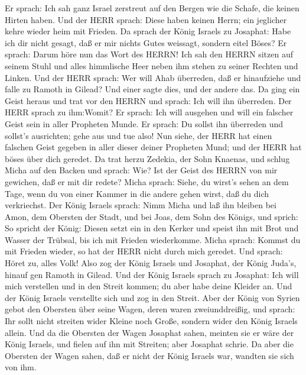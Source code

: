  Er sprach: Ich sah ganz Israel zerstreut auf den Bergen
wie die Schafe, die keinen Hirten haben. Und der HERR sprach: Diese
haben keinen Herrn; ein jeglicher kehre wieder heim mit Frieden.
 Da sprach der König Israels zu Josaphat: Habe ich dir
nicht gesagt, daß er mir nichts Gutes weissagt, sondern eitel Böses?
 Er sprach: Darum höre nun das Wort des HERRN! Ich sah den
HERRN sitzen auf seinem Stuhl und alles himmlische Heer neben ihm stehen
zu seiner Rechten und Linken.  Und der HERR sprach: Wer
will Ahab überreden, daß er hinaufziehe und falle zu Ramoth in Gilead?
Und einer sagte dies, und der andere das.  Da ging ein
Geist heraus und trat vor den HERRN und sprach: Ich will ihn überreden.
Der HERR sprach zu ihm:Womit?  Er sprach: Ich will ausgehen
und will ein falscher Geist sein in aller Propheten Munde. Er sprach: Du
sollst ihn überreden und sollst's ausrichten; gehe aus und tue also!
 Nun siehe, der HERR hat einen falschen Geist gegeben in
aller dieser deiner Propheten Mund; und der HERR hat böses über dich
geredet.  Da trat herzu Zedekia, der Sohn Knaenas, und
schlug Micha auf den Backen und sprach: Wie? Ist der Geist des HERRN von
mir gewichen, daß er mit dir redete?  Micha sprach: Siehe,
du wirst's sehen an dem Tage, wenn du von einer Kammer in die andere
gehen wirst, daß du dich verkriechst.  Der König Israels
sprach: Nimm Micha und laß ihn bleiben bei Amon, dem Obersten der Stadt,
und bei Joas, dem Sohn des Königs,  und sprich: So spricht
der König: Diesen setzt ein in den Kerker und speist ihn mit Brot und
Wasser der Trübsal, bis ich mit Frieden wiederkomme.  Micha
sprach: Kommst du mit Frieden wieder, so hat der HERR nicht durch mich
geredet. Und sprach: Höret zu, alles Volk!  Also zog der
König Israels und Josaphat, der König Juda's, hinauf gen Ramoth in
Gilead.  Und der König Israels sprach zu Josaphat: Ich will
mich verstellen und in den Streit kommen; du aber habe deine Kleider an.
Und der König Israels verstellte sich und zog in den Streit.
 Aber der König von Syrien gebot den Obersten über seine
Wagen, deren waren zweiunddreißig, und sprach: Ihr sollt nicht streiten
wider Kleine noch Große, sondern wider den König Israels allein.
 Und da die Obersten der Wagen Josaphat sahen, meinten sie
er wäre der König Israels, und fielen auf ihn mit Streiten; aber
Josaphat schrie.  Da aber die Obersten der Wagen sahen, daß
er nicht der König Israels war, wandten sie sich von ihm. 
